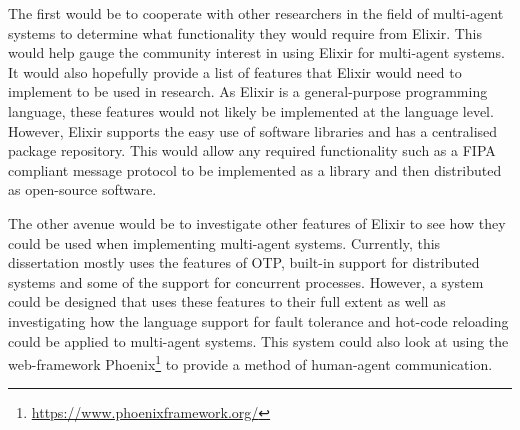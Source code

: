 The first would be to cooperate with other researchers in the field of multi-agent systems to determine what functionality they would require from Elixir.
This would help gauge the community interest in using Elixir for multi-agent systems.
It would also hopefully provide a list of features that Elixir would need to implement to be used in research.
As Elixir is a general-purpose programming language, these features would not likely be implemented at the language level.
However, Elixir supports the easy use of software libraries and has a centralised package repository.
This would allow any required functionality such as a FIPA compliant message protocol to be implemented as a library and then distributed as open-source software.

The other avenue would be to investigate other features of Elixir to see how they could be used when implementing multi-agent systems.
Currently, this dissertation mostly uses the features of OTP, built-in support for distributed systems and some of the support for concurrent processes.
However, a system could be designed that uses these features to their full extent as well as investigating how the language support for fault tolerance and hot-code reloading could be applied to multi-agent systems.
This system could also look at using the web-framework Phoenix\footnote{\url{https://www.phoenixframework.org/}} to provide a method of human-agent communication.
